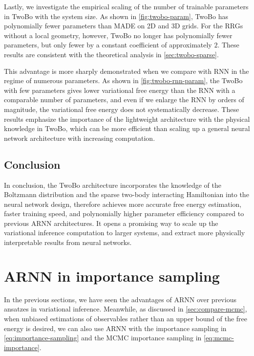 Lastly, we investigate the empirical scaling of the number of trainable parameters in TwoBo with the system size. As shown in \cref{fig:twobo-param}, TwoBo has polynomially fewer parameters than MADE on 2D and 3D grids. For the RRGs without a local geometry, however, TwoBo no longer has polynomially fewer parameters, but only fewer by a constant coefficient of approximately $2$. These results are consistent with the theoretical analysis in \cref{sec:twobo-sparse}.

This advantage is more sharply demonstrated when we compare with RNN in the regime of numerous parameters. As shown in \cref{fig:twobo-rnn-param}, the TwoBo with few parameters gives lower variational free energy than the RNN with a comparable number of parameters, and even if we enlarge the RNN by orders of magnitude, the variational free energy does not systematically decrease. These results emphasize the importance of the lightweight architecture with the physical knowledge in TwoBo, which can be more efficient than scaling up a general neural network architecture with increasing computation.

\subsection{Conclusion}

In conclusion, the TwoBo architecture incorporates the knowledge of the Boltzmann distribution and the sparse two-body interacting Hamiltonian into the neural network design, therefore achieves more accurate free energy estimation, faster training speed, and polynomially higher parameter efficiency compared to previous ARNN architectures. It opens a promising way to scale up the variational inference computation to larger systems, and extract more physically interpretable results from neural networks.

\section{ARNN in importance sampling}
\label{sec:arnn-mcmc}

In the previous sections, we have seen the advantages of ARNN over previous ansatzes in variational inference. Meanwhile, as discussed in \cref{sec:compare-mcmc}, when unbiased estimations of observables rather than an upper bound of the free energy is desired, we can also use ARNN with the importance sampling in \cref{eq:importance-sampling} and the MCMC importance sampling in \cref{eq:mcmc-importance}.

